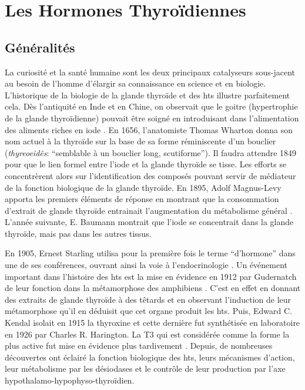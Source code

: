 \documentclass[../main.tex]{subfiles}
\begin{document}
\chapter{Les Hormones Thyroïdiennes}


\section{Généralités}

	La curiosité et la santé humaine sont les deux principaux catalyseurs sous-jacent au besoin de l'homme d'élargir sa connaissance en science et en biologie.
	L'historique de la biologie de la glande thyroïde et des \glspl{ht} illustre parfaitement cela.
	Dès l'antiquité en Inde et en Chine, on observait que le goitre (hypertrophie de la glande thyroïdienne) pouvait être soigné en introduisant dans l'alimentation des aliments riches en iode \citep{Niazi2011}.
	En 1656, l'anatomiste Thomas Wharton donna son nom actuel à la thyroïde sur la base de sa forme réminiscente d'un bouclier (\textit{thyreoeidês}: ``semblable à un bouclier long, scutiforme'').
	Il faudra attendre 1849 pour que le lien formel entre l'iode et la glande thyroïde se tisse.
	Les efforts se concentrèrent alors sur l'identification des composés pouvant servir de médiateur de la fonction biologique de la glande thyroïde.
	En 1895, Adolf Magnus-Levy apporta les premiers éléments de réponse en montrant que la consommation d'extrait de glande thyroïde entrainait l'augmentation du métabolisme général \citep{Magnus-Levy1895}.
	L'année suivante, E. Baumann montrait que l'iode se concentrait dans la glande thyroïde, mais pas dans les autres tissus\citep{Baumann1896}.
	\par
	En 1905, Ernest Starling utilisa pour la première fois le terme ``d'hormone'' dans une de ses conférences, ouvrant ainsi la voie à l'endocrinologie .
	Un événement important dans l'histoire des \glspl{ht} est la mise en évidence en 1912 par Gudernatch de leur fonction dans la métamorphose des amphibiens \citep{Gudernatsch1912}.
	C'est en effet en donnant des extraits de glande thyroïde à des têtards et en observant l'induction de leur métamorphose qu'il en déduisit que cet organe produit les \glspl{ht}.
	Puis, Edward C. Kendal isolait en 1915 la thyroxine et cette dernière fut synthétisée en laboratoire en 1926 par Charles R. Harington.
	La T3 qui est considérée comme la forme la plus active fut mise en évidence plus tardivement \citep{Gross1952,Roche1952}.
	Depuis, de nombreuses découvertes ont éclairé la fonction biologique des \glspl{ht}, leurs mécanismes d'action, leur métabolisme par les désiodases et le contrôle de leur production par l'axe hypothalamo-hypophyso-thyroïdien.
\end{document}
